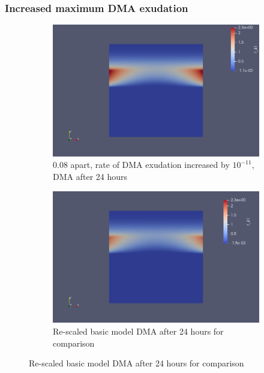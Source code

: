 \documentclass[11pt]{article}
\numberwithin{equation}{section}
\begin{document}
\subsubsection{Increased maximum DMA exudation}

 \begin{figure}
     \centering
     \caption{DMA increased}
     \begin{subfigure}[t]{0.45\textwidth}
     \includegraphics[width=\textwidth]{Figures/testpics/IncreasedBufferDMA24.png}
     \caption{0.08 apart, rate of DMA exudation increased by $10^{-11}$, DMA after 24 hours}
     \end{subfigure}
     \begin{subfigure}[t]{0.45\textwidth}
     \includegraphics[width=\textwidth]{Figures/testpics/BasictoComparetoDistance.png}
     \caption{Re-scaled basic model DMA after 24 hours for comparison}
     \end{subfigure}
 \end{figure}
\end{document}
